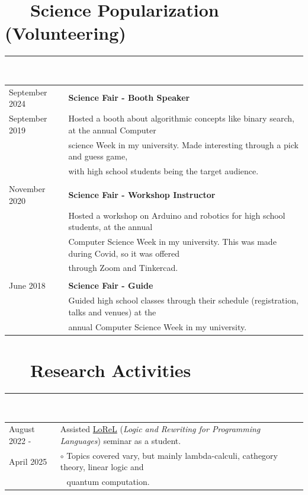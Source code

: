 \documentclass{article}
\newcommand{\shade}[1]{\textcolor{myGray}{#1}}
\begin{document}
\section*{\faUsers ~~ Science Popularization (Volunteering)}
\hrule

\
\newline
\

\begin{longtable}{l | l}

September 2024 & \textbf{Science Fair - Booth Speaker} \\
September 2019 & Hosted a booth about algorithmic concepts like binary search, at the annual Computer \\
			    & science Week in my university. Made interesting through a pick and guess game, \\
			    & with high school students being the target audience. \\
			    \\
November 2020 & \textbf{Science Fair - Workshop Instructor} \\
		      & Hosted a workshop on Arduino and robotics for high school students, at the annual \\
		      & Computer Science Week in my university. This was made during Covid, so it was offered \\
		      & through Zoom and Tinkercad.\\
			  \\
June 2018 & \textbf{Science Fair - Guide} \\
	      & Guided high school classes through their schedule (registration, talks and venues) at the \\
	      & annual Computer Science Week in my university. \\
\end{longtable}

\section*{\faCogs ~~ Research Activities}
\hrule

\
\newline
\

\begin{longtable}{l | l}
August 2022 - & Assisted \href{https://lorel-team.github.io}{LoReL} (\textit{Logic and Rewriting for Programming Languages}) seminar as a student. \\
April 2025  & \indent $\circ$ \shade{Topics covered vary, but mainly lambda-calculi, cathegory theory, linear logic and} \\
            & \indent $~~$ \shade{quantum computation.}
\end{longtable}
\end{document}
